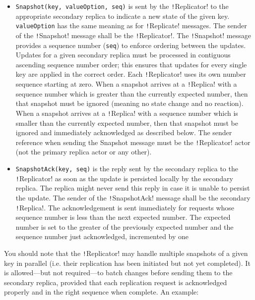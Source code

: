 \documentclass{article}
\begin{document}
\begin{itemize}
    \item \texttt{Snapshot(key, valueOption, seq)} is sent by the \texttt!Replicator! to the appropriate secondary replica to indicate a new state of the given key. \texttt{valueOption} has the same meaning as for \texttt!Replicate! messages. The sender of the \texttt!Snapshot! message shall be the \texttt!Replicator!. The \texttt!Snapshot! message provides a sequence number (\texttt{seq}) to enforce ordering between the updates. Updates for a given secondary replica must be processed in contiguous ascending sequence number order; this ensures that updates for every single key are applied in the correct order. Each \texttt!Replicator! uses its own number sequence starting at zero. When a snapshot arrives at a \texttt!Replica! with a sequence number which is greater than the currently expected number, then that snapshot must be ignored (meaning no state change and no reaction). When a snapshot arrives at a \texttt!Replica! with a sequence number which is smaller than the currently expected number, then that snapshot must be ignored and immediately acknowledged as described below. The sender reference when sending the Snapshot message must be the \texttt!Replicator! actor (not the primary replica actor or any other).
    \item \texttt{SnapshotAck(key, seq)} is the reply sent by the secondary replica to the \texttt!Replicator! as soon as the update is persisted locally by the secondary replica. The replica might never send this reply in case it is unable to persist the update. The sender of the \texttt!SnapshotAck! message shall be the secondary \texttt!Replica!. The acknowledgement is sent immediately for requests whose sequence number is less than the next expected number. The expected number is set to the greater of the previously expected number and the sequence number just acknowledged, incremented by one
\end{itemize}

You should note that the \texttt!Replicator! may handle multiple snapshots of a given key in parallel (i.e. their replication has been initiated but not yet completed). It is allowed—but not required—to batch changes before sending them to the secondary replica, provided that each replication request is acknowledged properly and in the right sequence when complete. An example:
\end{document}
